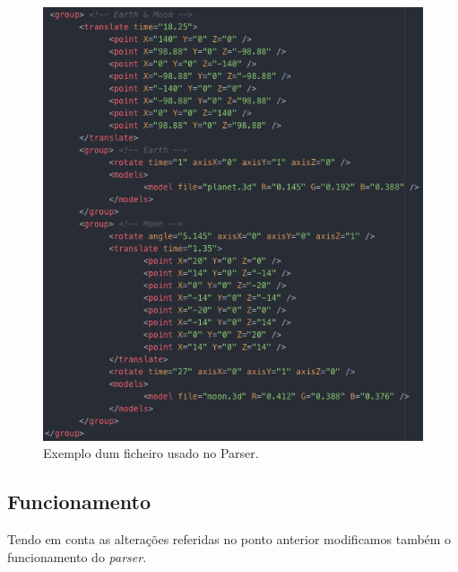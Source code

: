 \documentclass[a4paper]{article}
\begin{document}
\begin{figure}[H]
\centering
\includegraphics[scale=0.50]{ficheiro_parser.png}
\caption{Exemplo dum ficheiro usado no Parser.}
\label{img:ficheiro_parser}
\end{figure}

\subsection{Funcionamento}
\label{sec:funcionamento}

Tendo em conta as alterações referidas no ponto anterior modificamos também o funcionamento do \textit{parser}.
\end{document}
